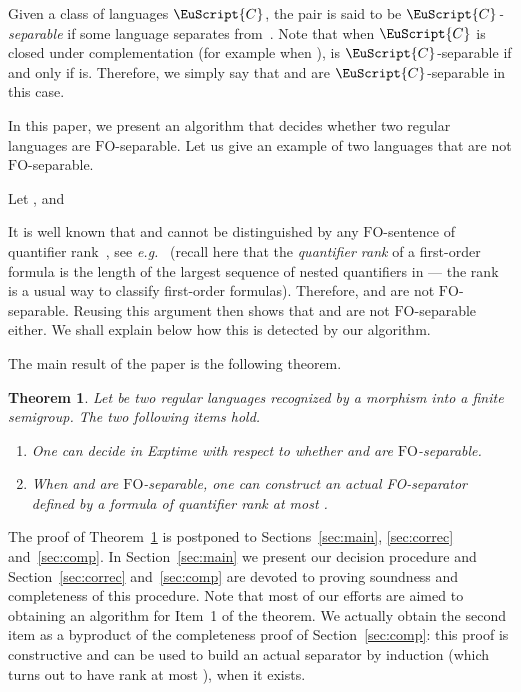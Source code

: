 \documentclass{CSML}
\newcommand\Cs{\ensuremath{\EuScript{C}}\xspace}
\newcommand{\fo}{\ensuremath{\text{FO}}\xspace}
\theoremstyle{plain}
\newtheorem{theorem}[thm]{Theorem}
\begin{document}
Given a class of languages \Cs, the pair  is said to be
\emph{\Cs-separable} if some language  separates 
from~. Note that when \Cs is closed under complementation (for
example when ),  is \Cs-separable if and only
if  is. Therefore, we simply say that  and  are
\Cs-separable in this case.

In this paper, we present an algorithm that decides whether two
regular languages are \fo-separable. Let us give an example of two
languages that are not \fo-separable.

\begin{exa} \label{ex:main}
Let ,  and


It is well known that  and  cannot be
distinguished by any \fo-sentence of quantifier rank~, see
\emph{e.g.}~\cite{bookstraub} (recall here that the \emph{quantifier rank} of a first-order formula  is the length of the largest sequence of nested
quantifiers in  --- the rank is a  usual way to classify first-order formulas).
Therefore,  and  are not
\fo-separable. Reusing this argument then shows that  and 
are not \fo-separable either. We shall explain below how this is
detected by our algorithm.
\end{exa}

The main result of the paper is the following theorem.

\begin{theorem} \label{th:main}
Let  be two regular languages recognized by a morphism
 into a finite semigroup. The two following items
hold.
\begin{enumerate}
\item\label{item:thmain:1} One can decide in {\sc Exptime} with respect to  whether
   and  are \fo-separable.
\item\label{item:thmain:2} When  and  are \fo-separable, one can construct an
  actual FO-separator defined by a formula of quantifier rank at most
  .
\end{enumerate}
\end{theorem}

\noindent The proof of Theorem~\ref{th:main} is postponed to
Sections~\ref{sec:main}, \ref{sec:correc} and~\ref{sec:comp}. In
Section~\ref{sec:main} we present our decision procedure and
Section~\ref{sec:correc} and~\ref{sec:comp} are devoted to proving
soundness and completeness of this procedure. Note that most of our
efforts are aimed to obtaining an algorithm for Item~1 of the theorem.
We actually obtain the second item as a byproduct of the completeness
proof of Section~\ref{sec:comp}: this proof is constructive and can be
used to build an actual separator by induction (which turns out to
have rank at most ), when it exists.
\end{document}

